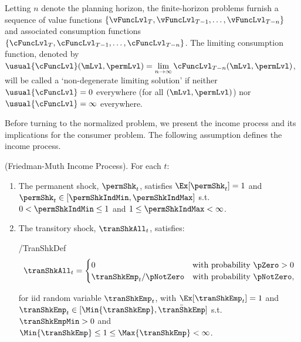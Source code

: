 \documentclass[\econtexRoot/BufferStockTheory]{subfiles}
\begin{document}
Letting $n$ denote the planning horizon, the finite-horizon problems furnish a sequence of value functions $\{\vFuncLvl_{T},\vFuncLvl_{T-1},\ldots,\vFuncLvl_{T-n}\}$ and associated consumption functions $\{\cFuncLvl_{T},\cFuncLvl_{T-1},\ldots,\cFuncLvl_{T-n}\}$.
The limiting consumption function, denoted by $\usual{\cFuncLvl}(\mLvl,\permLvl) = \lim\limits_{n \rightarrow \infty} \cFuncLvl_{T-n}(\mLvl,\permLvl)$, will be called a `non-degenerate limiting solution' if  neither $\usual{\cFuncLvl}=0$ everywhere (for all $(\mLvl,\permLvl)$) nor $\usual{\cFuncLvl}=\infty$ everywhere.

Before turning to the normalized problem, we present the income process and its implications for the consumer problem.
The following assumption defines the income process.

\begin{assumI}\label{ass:shocks}(Friedman-Muth Income Process).
For each $t$:
\begin{enumerate}
\item The permanent shock, $\permShk_{t}$, satisfies $\Ex[{\permShk}_{t}]=1$ and  $\permShk_{t}\in [\permShkIndMin,\permShkIndMax]$ s.t. $0 < \permShkIndMin \leq 1$ and $1 \leq \permShkIndMax < \infty$. 
\item The transitory shock, $\tranShkAll_{t}$, satisfies: 
\begin{verbatimwrite}{\EqDir/TranShkDef}
  \begin{equation}
    \tranShkAll_{t}=
    \begin{cases}
      0\phantom{_{t+1}/\pNotZero} & \text{with probability $\pZero > 0$} \\
      \tranShkEmp_{t}/\pNotZero      & \text{with probability $\pNotZero  $}, %
    \end{cases} \label{eq:TranShkDef}
  \end{equation}
\end{verbatimwrite}\unskip

\noindent for iid random variable $\tranShkEmp_{t}$,  with $\Ex[{\tranShkEmp}_{t}]=1$ and $ \tranShkEmp_{t} \in [\Min{\tranShkEmp}, \bar{\tranShkEmp}]$ s.t.
$\tranShkEmpMin >0$ and $\Min{\tranShkEmp} \leq 1 \leq \Max{\tranShkEmp} < \infty$.

\end{enumerate} 
\end{assumI}
\end{document}
